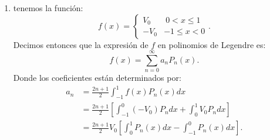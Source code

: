 


    

    \begin{enumerate}
      \item tenemos la función: \[
	  f\left( x \right) =
      \begin{cases}
	V_0 &\ 0 < x \le 1\\
	-V_0 & -1 \le x < 0
      \end{cases}
      .\] 
      Decimos entonces que la expresión de $f$ en polinomios de Legendre es: \[
      f\left( x \right) = \displaystyle \sum_{n=0}^{\infty} a_nP_n\left( x \right) 
      .\] Donde los coeficientes están determinados por:
      \begin{align*}
	a_n &= \frac{2n + 1}{2} \int_{-1}^{1} f\left( x \right) P_n\left( x \right) dx \\
	    &= \frac{2n + 1}{2} \left[ \int_{-1}^{0} \left( -V_{0} \right) P_n dx + \int_{0}^{1}V_0P_n dx \right]\\
	    &= \frac{2n + 1}{2}V_0 \left[ \int_{0}^{1}P_n\left( x \right) dx - \int_{-1}^{0}P_n\left( x \right) dx \right] 
      .\end{align*}


\end{enumerate}
